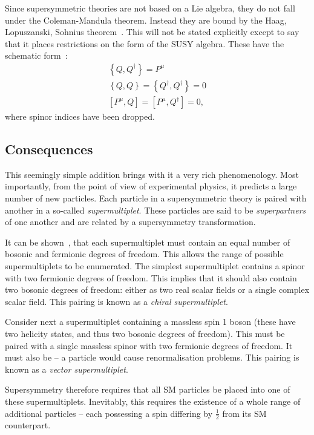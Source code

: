 Since supersymmetric theories are not based on a Lie algebra, they do not fall
under the Coleman-Mandula theorem. Instead they are bound by the Haag,
Lopuszanski, Sohnius theorem~\cite{hls_theorem}. This will not be stated explicitly except to say
that it places restrictions on the form of the \ac{SUSY} algebra. These have the
schematic form~\cite{susy_primer}:
\begin{eqnarray}
\label{eqn:susy_commutator}
\left\{Q,Q^{\dagger}\right\} = P^{\mu}\\
\left\{Q,Q\right\} = \left\{Q^{\dagger}, Q^{\dagger}\right\} = 0\\
\left[P^{\mu}, Q\right] = \left[P^{\mu}, Q^{\dagger}\right] = 0,
\end{eqnarray}
where spinor indices have been dropped.

\subsection{Consequences}
\label{sec:consequences}
This seemingly simple addition brings with it a very rich phenomenology. Most
importantly, from the point of view of experimental physics, it predicts a large
number of new particles. Each particle in a supersymmetric theory is paired with
another in a so-called \emph{supermultiplet}. These particles are said to be
\emph{superpartners} of one another and are related by a supersymmetry
transformation.

It can be shown~\cite{susy_primer}, that each supermultiplet must contain an
equal number of bosonic and fermionic degrees of freedom. This allows the range
of possible supermultiplets to be enumerated. The simplest supermultiplet
contains a spinor with two fermionic degrees of freedom. This implies that it
should also contain two bosonic degrees of freedom: either as two real scalar
fields or a single complex scalar field. This pairing is known as a \emph{chiral
  supermultiplet}.

Consider next a supermultiplet containing a massless spin 1 boson (these have
two helicity states, and thus two bosonic degrees of freedom). This must be
paired with a single massless spinor with two fermionic degrees of freedom. It
must also be \spinhalf -- a \spinthreetwo particle would cause renormalisation
problems. This pairing is known as a \emph{vector supermultiplet}.

Supersymmetry therefore requires that all \ac{SM} particles be placed into one
of these supermultiplets. Inevitably, this requires the existence of a whole
range of additional particles -- each possessing a spin differing by
$\frac{1}{2}$ from its \ac{SM} counterpart.


